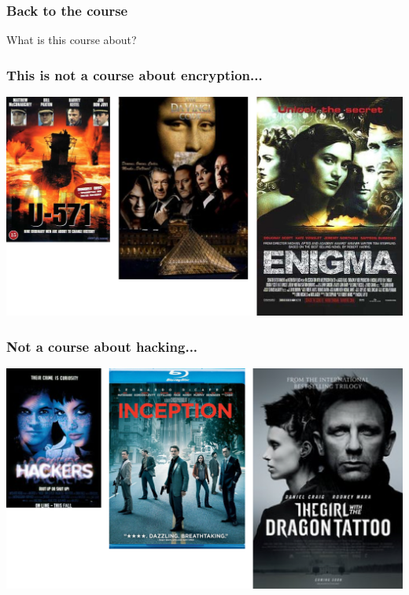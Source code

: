 \documentclass[10pt,handout]{beamer}
\begin{document}

\begin{frame}

\frametitle{Back to the course}

What is this course about?
\\[2em]

\end{frame}


\begin{frame}

\frametitle{This is not a course about encryption...}

\hspace*{-1.5em}
\includegraphics[width=1.1\textwidth]{crypto.png}

\end{frame}


\begin{frame}

\frametitle{Not a course about hacking...}

\hspace*{-1.5em}
\includegraphics[width=1.1\textwidth]{hacking.png}

\end{frame}
\end{document}
